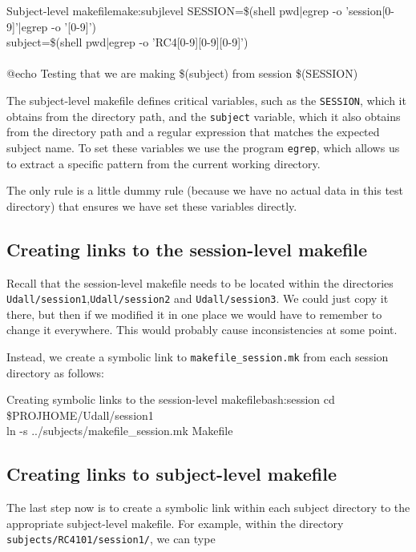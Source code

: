 \begin{make}{Subject-level makefile}{make:subjlevel}
        SESSION=\$(shell pwd|egrep -o 'session[0-9]'|egrep -o '[0-9]')\\

        subject=\$(shell pwd|egrep -o 'RC4[0-9][0-9][0-9]')\\
        \\
	         \tab @echo Testing that we are making \$(subject) from session \$(SESSION)\\

\end{make}

The subject-level makefile defines critical variables, such as the \texttt{SESSION}, which it obtains from the directory path, and the \texttt{subject} variable, which it also obtains from the directory path and a regular expression that matches the expected subject name. To set these variables we use the program \texttt{egrep}, which allows us to extract a specific pattern from the current working directory.

The only rule is a little dummy rule (because we have no actual data in this test directory) that ensures we have set these variables directly. 

\subsection{Creating links to the session-level makefile}
Recall that the session-level makefile needs to be located within the directories \texttt{Udall/session1},\texttt{Udall/session2} and \texttt{Udall/session3}. We could just copy it there, but then if we modified it in one place we would have to remember to change it everywhere. This would probably cause inconsistencies at some point. 

Instead, we create a symbolic link to \texttt{makefile_session.mk} from each session directory as follows:

\begin{bash}{Creating symbolic links to the session-level makefile}{bash:session}
 cd \$PROJHOME/Udall/session1\\
ln -s ../subjects/makefile_session.mk Makefile\\
\end{bash}

\subsection{Creating links to subject-level makefile}
The last step now is to create a symbolic link within each subject directory to the appropriate subject-level makefile. For example, within the directory \texttt{subjects/RC4101/session1/}, we can type


